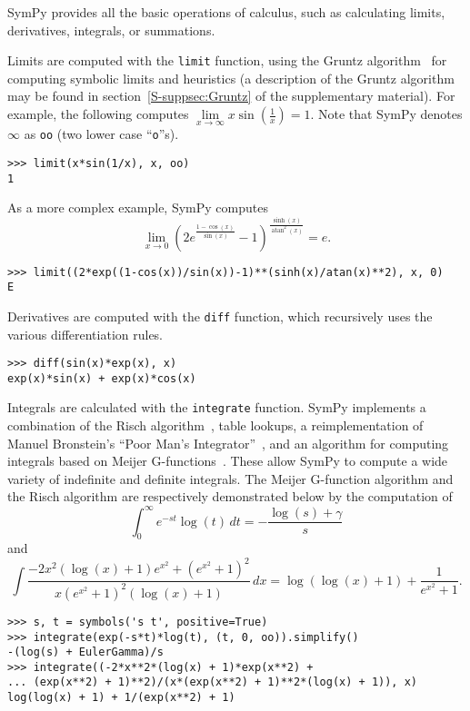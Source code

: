 SymPy provides all the basic operations of calculus, such as calculating
limits, derivatives, integrals, or summations.

Limits are computed with the \verb|limit| function, using the Gruntz
algorithm~\cite{Gruntz1996limits} for computing symbolic limits and heuristics
(a description of the Gruntz algorithm may be found in
section~\ref{S-suppsec:Gruntz} of the supplementary material).
For example, the following computes
$\lim\limits_{x\to \infty} x\sin(\frac{1}{x})=1$. Note that SymPy denotes
$\infty$ as \verb|oo| (two lower case ``\verb|o|''s).
\begin{verbatim}
>>> limit(x*sin(1/x), x, oo)
1
\end{verbatim}
As a more complex example, SymPy computes \[\lim\limits_{x\to 0}{\left(2 e^{\frac{1 - \cos{\left (x \right )}}{\sin{\left (x \right )}}} -
  1\right)}^{\frac{\sinh{\left (x \right )}}{\operatorname{atan}^{2}{\left (x
      \right )}}} = e.\]
\begin{verbatim}
>>> limit((2*exp((1-cos(x))/sin(x))-1)**(sinh(x)/atan(x)**2), x, 0)
E
\end{verbatim}

Derivatives are computed with the \verb|diff| function, which recursively uses
the various differentiation rules.
\begin{verbatim}
>>> diff(sin(x)*exp(x), x)
exp(x)*sin(x) + exp(x)*cos(x)
\end{verbatim}

Integrals are calculated with the \verb|integrate| function. SymPy
implements a combination of the Risch
algorithm~\cite{bronstein2005integration}, table lookups, a reimplementation
of Manuel Bronstein's ``Poor Man's Integrator''~\cite{Bronstein2005pmint}, and
an algorithm for computing integrals based on Meijer G-functions~\cite{Roach1996hyper,roach1997meijerg}. These allow
SymPy to compute a wide variety of indefinite and definite integrals. The
Meijer G-function algorithm and the Risch algorithm are respectively
demonstrated below by the computation of \[\int_{0}^{\infty} e^{-s t}\log{\left (t \right )}\, dt = - \frac{ \log{\left (s \right )} + \gamma}{s}\] and \[\int \frac{- 2 x^{2} \left(\log{\left (x \right )} + 1\right) e^{x^{2}} + {\left(e^{x^{2}} + 1\right)}^{2}}{x {\left(e^{x^{2}} + 1\right)}^{2} \left(\log{\left (x \right )} + 1\right)}\, dx = \log{\left (\log{\left (x \right )} + 1 \right )} + \frac{1}{e^{x^{2}} + 1}.\]
\begin{verbatim}
>>> s, t = symbols('s t', positive=True)
>>> integrate(exp(-s*t)*log(t), (t, 0, oo)).simplify()
-(log(s) + EulerGamma)/s
>>> integrate((-2*x**2*(log(x) + 1)*exp(x**2) +
... (exp(x**2) + 1)**2)/(x*(exp(x**2) + 1)**2*(log(x) + 1)), x)
log(log(x) + 1) + 1/(exp(x**2) + 1)
\end{verbatim}


